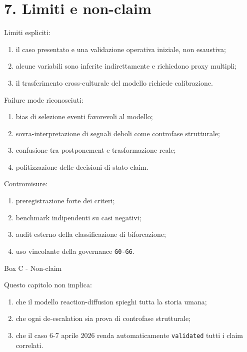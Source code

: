 \section{7. Limiti e non-claim}

Limiti espliciti:

\begin{enumerate}
\def\labelenumi{\arabic{enumi}.}
\tightlist
\item
  il caso presentato e una validazione operativa iniziale, non esaustiva;
\item
  alcune variabili sono inferite indirettamente e richiedono proxy multipli;
\item
  il trasferimento cross-culturale del modello richiede calibrazione.
\end{enumerate}

Failure mode riconosciuti:

\begin{enumerate}
\def\labelenumi{\arabic{enumi}.}
\tightlist
\item
  bias di selezione eventi favorevoli al modello;
\item
  sovra-interpretazione di segnali deboli come controfase strutturale;
\item
  confusione tra postponement e trasformazione reale;
\item
  politizzazione delle decisioni di stato claim.
\end{enumerate}

Contromisure:

\begin{enumerate}
\def\labelenumi{\arabic{enumi}.}
\tightlist
\item
  preregistrazione forte dei criteri;
\item
  benchmark indipendenti su casi negativi;
\item
  audit esterno della classificazione di biforcazione;
\item
  uso vincolante della governance \texttt{G0-G6}.
\end{enumerate}

Box C - Non-claim

Questo capitolo non implica:

\begin{enumerate}
\def\labelenumi{\arabic{enumi}.}
\tightlist
\item
  che il modello reaction-diffusion spieghi tutta la storia umana;
\item
  che ogni de-escalation sia prova di controfase strutturale;
\item
  che il caso 6-7 aprile 2026 renda automaticamente \texttt{validated} tutti i claim correlati.
\end{enumerate}

